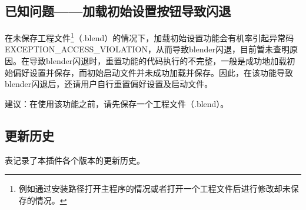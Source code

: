 \documentclass{../../public_resources/doc}
\begin{document}
\subsection{已知问题——加载初始设置按钮导致闪退}
在未保存工程文件\footnote{例如通过安装路径打开主程序的情况或者打开一个工程文件后进行修改却未保存的情况。}（.blend）的情况下，加载初始设置功能会有机率引起异常码EXCEPTION\_ACCESS\_VIOLATION，从而导致blender闪退，目前暂未查明原因。在导致blender闪退时，重置功能的代码执行的不完整，一般是成功地加载初始偏好设置并保存，而初始启动文件并未成功加载并保存。因此，在该功能导致blender闪退后，还请用户自行重置偏好设置及启动文件。

建议：在使用该功能之前，请先保存一个工程文件（.blend）。

\subsection{更新历史}
表记录了本插件各个版本的更新历史。
\end{document}
